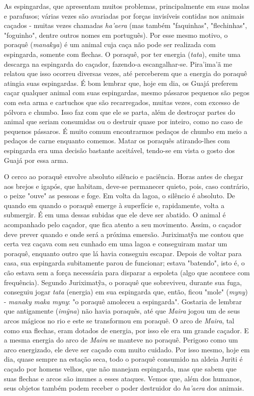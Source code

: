 As espingardas, que apresentam muitos problemas, principalmente em suas
molas e parafusos; várias vezes são avariadas por forças invisíveis
contidas nos animais caçados - muitas vezes chamadas \emph{ha'aera} (mas
também "faquinhas", "flechinhas", "foguinho", dentre outros nomes em
português). Por esse mesmo motivo, o poraquê (\emph{manakya}) é um
animal cuja caça não pode ser realizada com espingarda, somente com
flechas. O poraquê, por ter energia (\emph{tata}), emite uma descarga na
espingarda do caçador, fazendo-a escangalhar-se. Pira'ima'ã me relatou
que isso ocorreu diversas vezes, até perceberem que a energia do poraquê
atingia suas espingardas. É bom lembrar que, hoje em dia, os Guajá
preferem caçar qualquer animal com suas espingardas, mesmo pássaros
pequenos são pegos com esta arma e cartuchos que são recarregados,
muitas vezes, com excesso de pólvora e chumbo. Isso faz com que ele se
parta, além de destroçar partes do animal que seriam consumidas ou o
destruir quase por inteiro, como no caso de pequenos pássaros. É muito
comum encontrarmos pedaços de chumbo em meio a pedaços de carne enquanto
comemos. Matar os poraquês atirando-lhes com espingarda era uma decisão
bastante aceitável, tendo-se em vista o gosto dos Guajá por essa arma.

O cerco ao poraquê envolve absoluto silêncio e paciência. Horas antes de
chegar aos brejos e igapós, que habitam, deve-se permanecer quieto,
pois, caso contrário, o peixe "ouve" as pessoas e foge. Em volta da
lagoa, o silêncio é absoluto. De quando em quando o poraquê emerge à
superfície e, rapidamente, volta a submergir. É em uma dessas subidas
que ele deve ser abatido. O animal é acompanhado pelo caçador, que fica
atento a seu movimento. Assim, o caçador deve prever quando e onde será
a próxima emersão. Juriximatỹa me contou que certa vez caçava com seu
cunhado em uma lagoa e conseguiram matar um poraquê, enquanto outro que
lá havia conseguiu escapar. Depois de voltar para casa, sua espingarda
subitamente parou de funcionar; estava "batendo", isto é, o cão estava
sem a força necessária para disparar a espoleta (algo que acontece com
frequência). Segundo Juriximatỹa, o poraquê que sobreviveu, durante sua
fuga, conseguiu jogar \emph{tata} (energia) em sua espingarda que,
então, ficou "mole" (\emph{myny}) - \emph{manaky maka myny}: "o poraquê
amoleceu a espingarda". Gostaria de lembrar que antigamente
(\emph{imỹna}) não havia poraquês, até que \emph{Maira} jogou um de seus
arcos mágicos no rio e este se transformou em poraquê. O arco de
\emph{Maira}, tal como sua flechas, eram dotados de energia, por isso
ele era um grande caçador. E a mesma energia do arco de \emph{Maira} se
manteve no poraquê. Perigoso como um arco energizado, ele deve ser
caçado com muito cuidado. Por isso mesmo, hoje em dia, quase sempre na
estação seca, todo o poraquê consumido na aldeia Juriti é caçado por
homens velhos, que não manejam espingarda, mas que sabem que suas
flechas e arcos são imunes a esses ataques. Vemos que, além dos humanos,
seus objetos também podem receber o poder destruidor do \emph{ha'aera}
dos animais.

